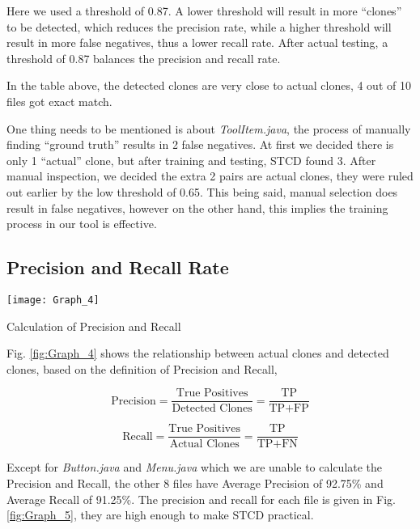 \documentclass[../main.tex]{subfiles}
\begin{document}
Here we used a threshold of 0.87. A lower threshold will result in more ``clones'' to be detected, which reduces the precision rate, while a higher threshold will result in more false negatives, thus a lower recall rate. After actual testing, a threshold of 0.87 balances the precision and recall rate.

In the table above, the detected clones are very close to actual clones, 4 out of 10 files got exact match.

One thing needs to be mentioned is about \textit{ToolItem.java}, the process of manually finding ``ground truth'' results in 2 false negatives. At first we decided there is only 1 ``actual'' clone, but after training and testing, STCD found 3. After manual inspection, we decided the extra 2 pairs are actual clones, they were ruled out earlier by the low threshold of 0.65. This being said, manual selection does result in false negatives, however on the other hand, this implies the training process in our tool is effective.

\subsection{Precision and Recall Rate}

\begin{figurehere}
\centering \texttt{[image: Graph\_4]} 
\caption{Calculation of Precision and Recall} \label{fig:Graph_4}
\end{figurehere}

Fig. \ref{fig:Graph_4} shows the relationship between actual clones and detected clones, based on the definition of Precision and Recall\cite{precision}, 

\begin{equation}
\text{Precision} = \frac{ \text{True Positives}} {\text{Detected Clones}} = \frac{ \text{TP}} {\text{TP} + \text{FP}}
\end{equation}

\begin{equation}
\text{Recall} = \frac{ \text{True Positives}} {\text{Actual Clones}} = \frac{ \text{TP}} {\text{TP} + \text{FN}}
\end{equation}

Except for \textit{Button.java} and \textit{Menu.java} which we are unable to calculate the Precision and Recall, the other 8 files have Average Precision of 92.75\% and Average Recall of 91.25\%. The precision and recall for each file is given in Fig. \ref{fig:Graph_5}, they are high enough to make STCD practical. \\
\end{document}
